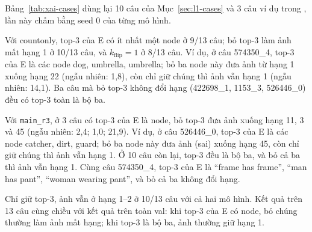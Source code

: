 Bảng~\ref{tab:xai-cases} dùng lại 10 câu của Mục~\ref{sec:l1-cases} và 3 câu ví dụ trong
, lần này chấm bằng seed 0 của từng mô hình.

Với countonly, top-3 của E có ít nhất một node ở 9/13 câu; bỏ top-3 làm ảnh mất hạng 1 ở 10/13 câu, và $k_{\text{flip}}=1$ ở 8/13 câu.
Ví dụ, ở câu 574350\_4, top-3 của E là các node dog, umbrella, umbrella; bỏ ba node này đưa ảnh từ hạng 1 xuống hạng 22 (ngẫu nhiên: 1,8), còn chỉ giữ chúng thì ảnh vẫn hạng 1 (ngẫu nhiên: 14,1).
Ba câu mà bỏ top-3 không đổi hạng (422698\_1, 1153\_3, 526446\_0) đều có top-3 toàn là bộ ba.

Với \texttt{main\_r3}, ở 3 câu có top-3 của E là node, bỏ top-3 đưa ảnh xuống hạng 11, 3 và 45 (ngẫu nhiên: 2,4; 1,0; 21,9).
Ví dụ, ở câu 526446\_0, top-3 của E là các node catcher, dirt, guard; bỏ ba node này đưa ảnh (sai) xuống hạng 45, còn chỉ giữ chúng thì ảnh vẫn hạng 1.
Ở 10 câu còn lại, top-3 đều là bộ ba, và bỏ cả ba thì ảnh vẫn hạng 1.
Cùng câu 574350\_4, top-3 của E là ``frame has frame'', ``man has pant'', ``woman wearing pant'', và bỏ cả ba không đổi hạng.

Chỉ giữ top-3, ảnh vẫn ở hạng 1--2 ở 10/13 câu với cả hai mô hình.
Kết quả trên 13 câu cùng chiều với kết quả trên toàn val: khi top-3 của E có node, bỏ chúng thường làm ảnh mất hạng; khi top-3 là bộ ba, ảnh thường giữ hạng 1.
